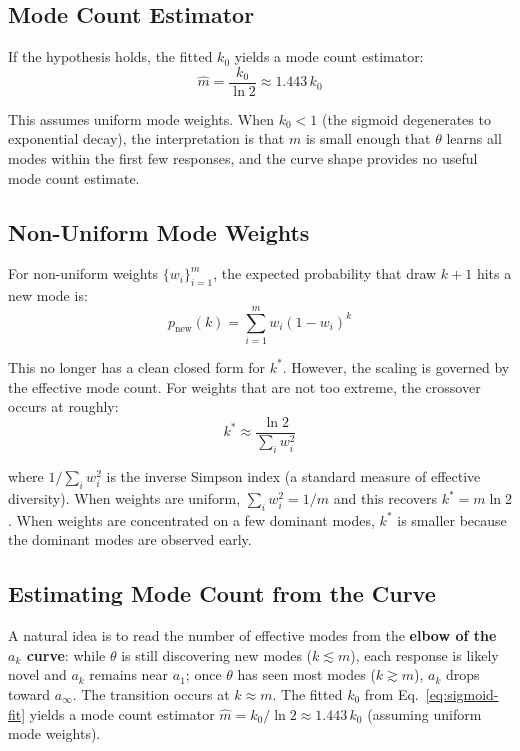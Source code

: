 \subsection{Mode Count Estimator}

If the hypothesis holds, the fitted $k_0$ yields a mode count estimator:
\begin{equation}\label{eq:mode-count-estimator}
    \hat{m} = \frac{k_0}{\ln 2} \approx 1.443\, k_0
\end{equation}

This assumes uniform mode weights.
When $k_0 < 1$ (the sigmoid degenerates to exponential decay), the interpretation is that $m$ is small enough that $\theta$ learns all modes within the first few responses, and the curve shape provides no useful mode count estimate.

\subsection{Non-Uniform Mode Weights}

For non-uniform weights $\{w_i\}_{i=1}^m$, the expected probability that draw $k+1$ hits a new mode is:
\begin{equation}
    p_{\mathrm{new}}(k) = \sum_{i=1}^{m} w_i \left(1 - w_i\right)^{k}
\end{equation}

This no longer has a clean closed form for $k^*$.
However, the scaling is governed by the effective mode count.
For weights that are not too extreme, the crossover occurs at roughly:
\begin{equation}\label{eq:kstar-nonuniform}
    k^* \approx \frac{\ln 2}{\sum_i w_i^2}
\end{equation}

where $1/\sum_i w_i^2$ is the inverse Simpson index (a standard measure of effective diversity).
When weights are uniform, $\sum_i w_i^2 = 1/m$ and this recovers $k^* = m \ln 2$.
When weights are concentrated on a few dominant modes, $k^*$ is smaller because the dominant modes are observed early.

\subsection{Estimating Mode Count from the Curve}\label{sec:mode-count-from-curve}

A natural idea is to read the number of effective modes from the \textbf{elbow of the $a_k$ curve}: while $\theta$ is still discovering new modes ($k \lesssim m$), each response is likely novel and $a_k$ remains near $a_1$; once $\theta$ has seen most modes ($k \gtrsim m$), $a_k$ drops toward $a_\infty$.
The transition occurs at $k \approx m$.
The fitted $k_0$ from Eq.~\ref{eq:sigmoid-fit} yields a mode count estimator $\hat{m} = k_0 / \ln 2 \approx 1.443\, k_0$ (assuming uniform mode weights).

